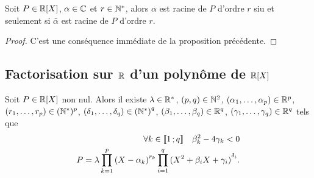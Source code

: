 \begin{prop}
  Soit \(P \in \mathbb{R}[X]\), \(\alpha \in \mathbb{C}\) et \(r \in \mathbb{N}^*\), alors \(\alpha\)
  est racine de \(P\) d'ordre \(r\) siu et seulement si \(\bar{\alpha}\) est
  racine de \(P\) d'ordre \(r\).
\end{prop}
\begin{proof}
  C'est une conséquence immédiate de la proposition précédente.
\end{proof}

\subsection{Factorisation sur \(\mathbb{R}\) d'un polynôme de \(\mathbb{R}[X]\)}

\begin{theo}
  Soit \(P \in \mathbb{R}[X]\) non nul. Alors il existe \(\lambda \in \mathbb{R}^*\), \((p,q)
  \in \mathbb{N}^2\), \((\alpha_1, \ldots, \alpha_p) \in \mathbb{R}^p\), \((r_1, \ldots, r_p)
  \in (\mathbb{N}^*)^p\), \((\delta_1, \ldots, \delta_q) \in {(\mathbb{N}^*)}^q\), \((\beta_1,
  \ldots, \beta_q) \in \mathbb{R}^q\), \((\gamma_1, \ldots, \gamma_q) \in \mathbb{R}^q\) tels
  que
  \begin{align}
    \forall k \in \mathopen{\llbracket}1\mathclose{}\mathpunct{};q\mathclose{\rrbracket} \quad \beta_k^2 - 4\gamma_k <0\\
    P = \lambda \prod_{k = 1}^p {(X-\alpha_k)}^{r_k} \prod_{i = 1}^q{(X^2+\beta_i
    X+\gamma_i)}^{\delta_i}.
  \end{align}
\end{theo}
